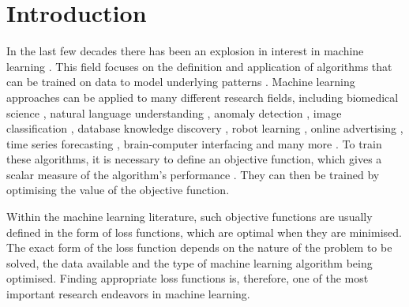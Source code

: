 \documentclass[sn-mathphys-num]{sn-jnl}%
\begin{document}




\maketitle


\section{Introduction}
    In the last few decades there has been an explosion in interest in machine learning \cite{ML_trends,ML_trends2}. This field focuses on the definition and application of algorithms that can be trained on data to model underlying patterns \cite{ML_2,ML_1,decision_trees,bishop1995neural}. 
    Machine learning approaches can be applied to many different research fields, including biomedical science \cite{survey_biomed,ml_biomed,brain_interface_survey,cancer_ml}, natural language understanding \cite{nlp_1,nlp_2}, \cite{computer_security_survey} anomaly detection \cite{anomaly_detection_survey}, image classification \cite{image_classification_survey}, database knowledge discovery \cite{frawley1992knowledge}, robot learning \cite{argall2009survey}, online advertising \cite{online_advertising}, time series forecasting \cite{time_series_forecasting_ml}, brain-computer interfacing \cite{brain_computer_interfaces} and many more \cite{other_applications}.
    To train these algorithms, it is necessary to define an objective function, which gives a scalar measure of the algorithm's performance \cite{von2007theory,ML_2}. They can then be trained by optimising the value of the objective function. %
    
    Within the machine learning literature, such objective functions are usually defined in the form of loss functions, which are optimal when they are minimised. The exact form of the loss function depends on the nature of the problem to be solved, the data available and the type of machine learning algorithm being optimised. Finding appropriate loss functions is, therefore, one of the most important research endeavors in machine learning. %
\end{document}
